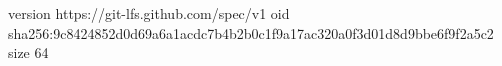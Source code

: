 version https://git-lfs.github.com/spec/v1
oid sha256:9c8424852d0d69a6a1acdc7b4b2b0c1f9a17ac320a0f3d01d8d9bbe6f9f2a5c2
size 64
